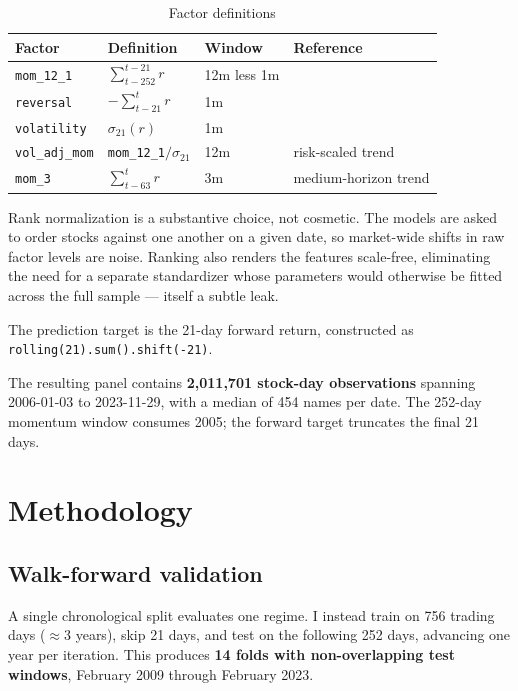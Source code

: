 \documentclass[11pt]{article}
\begin{document}
\begin{table}[H]
\centering
\caption{Factor definitions}
\begin{tabular}{llll}
\toprule
\textbf{Factor} & \textbf{Definition} & \textbf{Window} & \textbf{Reference} \\
\midrule
\texttt{mom\_12\_1}    & $\sum_{t-252}^{t-21} r$      & 12m less 1m & \citet{jegadeesh1993} \\
\texttt{reversal}      & $-\sum_{t-21}^{t} r$         & 1m          & \citet{jegadeesh1990} \\
\texttt{volatility}    & $\sigma_{21}(r)$             & 1m          & \citet{ang2006} \\
\texttt{vol\_adj\_mom} & \texttt{mom\_12\_1}$/\sigma_{21}$ & 12m     & risk-scaled trend \\
\texttt{mom\_3}        & $\sum_{t-63}^{t} r$          & 3m          & medium-horizon trend \\
\bottomrule
\end{tabular}
\end{table}

Rank normalization is a substantive choice, not cosmetic. The models are asked
to order stocks against one another on a given date, so market-wide shifts in
raw factor levels are noise. Ranking also renders the features scale-free,
eliminating the need for a separate standardizer whose parameters would
otherwise be fitted across the full sample --- itself a subtle leak.

The prediction target is the 21-day forward return, constructed as
\texttt{rolling(21).sum().shift(-21)}.

The resulting panel contains \textbf{2{,}011{,}701 stock-day observations}
spanning 2006-01-03 to 2023-11-29, with a median of 454 names per date. The
252-day momentum window consumes 2005; the forward target truncates the final
21 days.

\section{Methodology}

\subsection{Walk-forward validation}

A single chronological split evaluates one regime. I instead train on 756
trading days ($\approx$3 years), skip 21 days, and test on the following 252
days, advancing one year per iteration. This produces \textbf{14 folds with
non-overlapping test windows}, February 2009 through February 2023.
\end{document}
